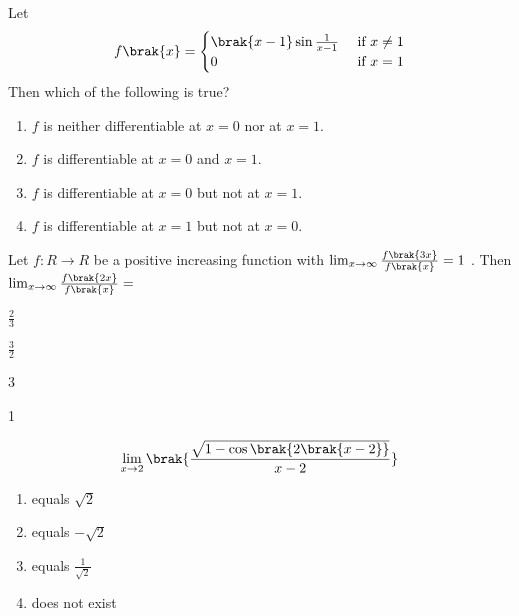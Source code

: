     \item Let 
         \[ f\brak{x}= \begin{cases}
     \brak{x-1}\sin\frac{1}{x-1} & \text{ if $ x\neq1 $}\\
     0 & \text{ if $ x = 1 $}
  \end{cases}
  \]
    Then which of the following is true? 
       \hfill{}
     \begin{enumerate}
     \item $f$ is neither differentiable at $x=0$ nor at $x=1$.\item $f$ is differentiable at $x=0$ and $x=1$.\item $f$ is differentiable at $x=0$ but not at $x=1$.\item $f$ is differentiable at $x=1$ but not at $x=0$.
     \end{enumerate}
    \item Let $f:R\rightarrow R$ be a positive increasing function with
     $\lim_{x\to\infty} \frac{f\brak{3x}}{f\brak{x}}=1$ . Then  $\lim_{x\to\infty} \frac{f\brak{2x}}{f\brak{x}}=$\hfill{}
     \begin{enumerate}
     \begin{multicols}{4}
     \item $\frac{2}{3}$ \item $\frac{3}{2}$ \item3 \item1 \end{multicols}
     \end{enumerate}
    \item  
        \[ \lim_{x\to 2} \brak{\frac{\sqrt{1-\cos\brak{2\brak{x-2}}}}{x-2}}\]
      \hfill{}
     \begin{multicols}{2}
       \begin{enumerate}
     \item equals $\sqrt{2}$ \item equals $-\sqrt{2}$ \item equals $\frac{1}{\sqrt{2}}$ \item does not exist
     \end{enumerate}  
     \end{multicols}
     
